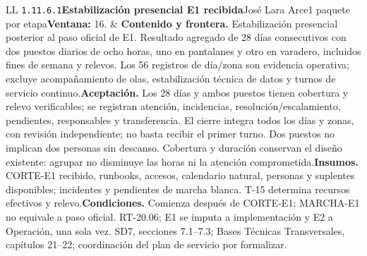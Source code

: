 \begin{longtable}{L{\tabcolsep\relax}L{\tabcolsep\relax}}
\texttt{1.\allowbreak{}11.\allowbreak{}6.\allowbreak{}1}\newline{}\textbf{Estabilización presencial E1 recibida}\newline{}José Lara Arce\newline{}1 paquete por etapa\newline{}\textbf{Ventana:} 16. & \textbf{Contenido y frontera.} Estabilización presencial posterior al paso oficial de E1. Resultado agregado de 28 días consecutivos con dos puestos diarios de ocho horas, uno en pantalanes y otro en varadero, incluidos fines de semana y relevos. Los 56 registros de día/zona son evidencia operativa; excluye acompañamiento de olas, estabilización técnica de datos y turnos de servicio continuo.\newline{}\textbf{Aceptación.} Los 28 días y ambos puestos tienen cobertura y relevo verificables; se registran atención, incidencias, resolución/escalamiento, pendientes, responsables y transferencia. El cierre integra todos los días y zonas, con revisión independiente; no basta recibir el primer turno. Dos puestos no implican dos personas sin descanso. Cobertura y duración conservan el diseño existente: agrupar no disminuye las horas ni la atención comprometida.\newline{}\textbf{Insumos.} CORTE-E1 recibido, runbooks, accesos, calendario natural, personas y suplentes disponibles; incidentes y pendientes de marcha blanca. T-15 determina recursos efectivos y relevo.\newline{}\textbf{Condiciones.} Comienza después de CORTE-E1; MARCHA-E1 no equivale a paso oficial. RT-20.06; E1 se imputa a implementación y E2 a Operación, una sola vez. SD7, secciones 7.1--7.3; Bases Técnicas Transversales, capítulos 21--22; coordinación del plan de servicio por formalizar.\\\hline

\end{longtable}
